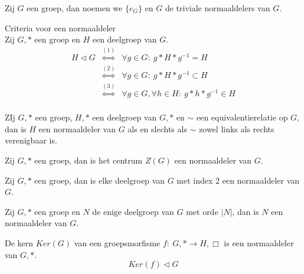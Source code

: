 \documentclass[main.tex]{subfiles}
\begin{document}
\begin{de}
  Zij $G$ een groep, dan noemen we $\{e_{G}\}$ en $G$ de triviale normaaldelers van $G$.
\end{de}

\begin{st}
  \label{st:criteria-voor-normaaldeler}
  Criteria voor een normaaldeler\\
  Zij $G,*$ een groep en $H$ een deelgroep van $G$.
  \[
  \begin{array}{rcl}
    H \triangleleft G &\overset{(1)}{\Leftrightarrow} & \forall g \in G:\ g*H*g^{-1} = H\\
                      &\overset{(2)}{\Leftrightarrow} & \forall g \in G:\ g*H*g^{-1} \subset H\\
                      &\overset{(3)}{\Leftrightarrow} & \forall g \in G,\forall h \in H:\ g*h*g^{-1} \in H\\
  \end{array}
  \]
  
\end{st}

\begin{st}
  ZIj $G,*$ een groep, $H,*$ een deelgroep van $G,*$ en $\sim$ een equivalentierelatie op $G$, dan is $H$ een normaaldeler van $G$ als en slechts als $\sim$ zowel links als rechts verenigbaar is.

\end{st}

\begin{pr}
  Zij $G,*$ een groep, dan is het centrum $Z(G)$ een normaaldeler van $G$.
  
\end{pr}

\begin{pr}
  Zij $G,*$ een groep, dan is elke deelgroep van $G$ met index $2$ een normaaldeler van $G$.
  
\end{pr}

\begin{pr}
  Zij $G,*$ een groep en $N$ de enige deelgroep van $G$ met orde $|N|$, dan is $N$ een normaaldeler van $G$.
  
\end{pr}

\begin{pr}
  De kern $Ker(G)$ van een groepsmorfisme $f:\ G,* \rightarrow H,\Box$ is een normaaldeler van $G,*$.
  \[ Ker(f) \triangleleft G \]
  
\end{pr}
\end{document}
